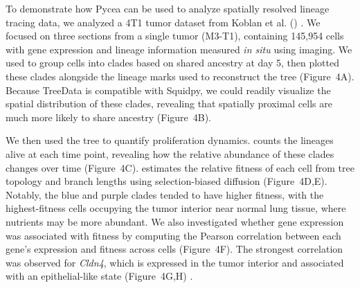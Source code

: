 To demonstrate how Pycea can be used to analyze spatially resolved lineage tracing data, we analyzed a 4T1 tumor dataset from Koblan et al. () \citep{koblan2025}. We focused on three sections from a single tumor (M3-T1), containing 145,954 cells with gene expression and lineage information measured \textit{in situ} using imaging. We used  to group cells into clades based on shared ancestry at day 5, then plotted these clades alongside the lineage marks used to reconstruct the tree (Figure~4A). Because TreeData is compatible with Squidpy, we could readily visualize the spatial distribution of these clades, revealing that spatially proximal cells are much more likely to share ancestry (Figure~4B).

We then used the tree to quantify proliferation dynamics.  counts the lineages alive at each time point, revealing how the relative abundance of these clades changes over time (Figure~4C).  estimates the relative fitness of each cell from tree topology and branch lengths using selection-biased diffusion \citep{neher2014} (Figure~4D,E). Notably, the blue and purple clades tended to have higher fitness, with the highest-fitness cells occupying the tumor interior near normal lung tissue, where nutrients may be more abundant. We also investigated whether gene expression was associated with fitness by computing the Pearson correlation between each gene's expression and fitness across cells (Figure~4F). The strongest correlation was observed for \textit{Cldn4}, which is expressed in the tumor interior and associated with an epithelial-like state (Figure~4G,H) \citep{koblan2025}.
